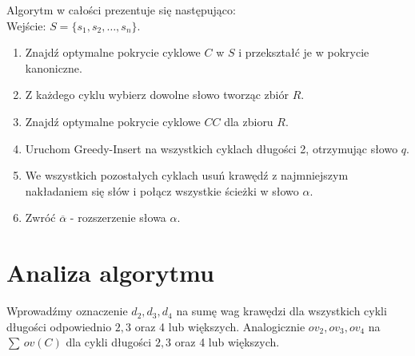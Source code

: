 \documentclass[12pt]{article}
\begin{document}
Algorytm w całości prezentuje się następująco: \\

Wejście: $S=\{s_1,s_2,\dots,s_n\}$.
\begin{enumerate}
\item Znajdź optymalne pokrycie cyklowe $C$ w $S$ i przekształć je w pokrycie kanoniczne.
\item Z każdego cyklu wybierz dowolne słowo tworząc zbiór $R$.
\item Znajdź optymalne pokrycie cyklowe $CC$ dla zbioru $R$.
\item Uruchom Greedy-Insert na wszystkich cyklach długości 2, otrzymując słowo $q$.
\item We wszystkich pozostałych cyklach usuń krawędź z najmniejszym nakładaniem się słów i połącz wszystkie ścieżki w słowo $\alpha$.
\item Zwróć $\overline{\alpha}$ - rozszerzenie słowa $\alpha$.
\end{enumerate}

\section{Analiza algorytmu}

Wprowadźmy oznaczenie $d_2,d_3,d_4$ na sumę wag krawędzi dla wszystkich cykli długości odpowiednio $2,3$ oraz 4 lub większych.
Analogicznie $ov_2,ov_3,ov_4$ na $\sum\,ov(C)$ dla cykli długości $2,3$ oraz 4 lub większych.
\end{document}
